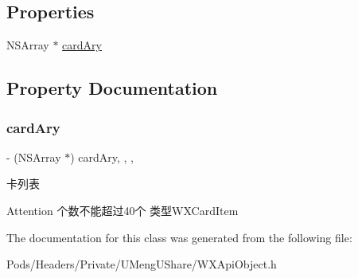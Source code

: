 \subsection*{Properties}
\begin{DoxyCompactItemize}
\item 
N\+S\+Array $\ast$ \mbox{\hyperlink{interface_add_card_to_w_x_card_package_req_a110539025ff4e8d49550c86e95daef61}{card\+Ary}}
\end{DoxyCompactItemize}


\subsection{Property Documentation}
\mbox{\label{interface_add_card_to_w_x_card_package_req_a110539025ff4e8d49550c86e95daef61}} 
\subsubsection{\texorpdfstring{card\+Ary}{cardAry}}
{\footnotesize\ttfamily -\/ (N\+S\+Array $\ast$) card\+Ary\hspace{0.3cm}{\ttfamily [read]}, {\ttfamily [write]}, {\ttfamily [nonatomic]}, {\ttfamily [retain]}}

卡列表 \begin{DoxyAttention}{Attention}
个数不能超过40个 类型\+W\+X\+Card\+Item 
\end{DoxyAttention}


The documentation for this class was generated from the following file\+:\begin{DoxyCompactItemize}
\item 
Pods/\+Headers/\+Private/\+U\+Meng\+U\+Share/W\+X\+Api\+Object.\+h\end{DoxyCompactItemize}
